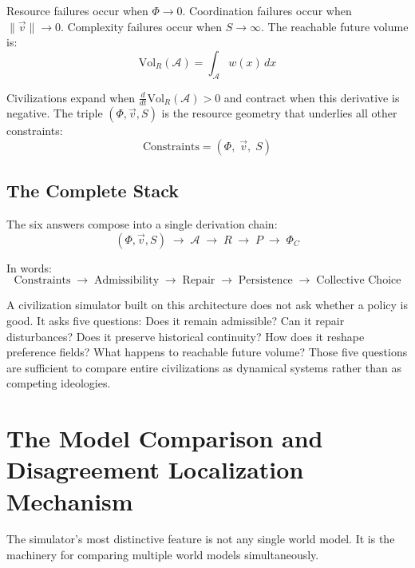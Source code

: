 \documentclass[12pt]{article}
\begin{document}
Resource failures occur when $\Phi \to 0$. Coordination failures occur when $\|\vec{v}\| \to 0$. Complexity failures occur when $S \to \infty$. The reachable future volume is:
\begin{equation}
  \mathrm{Vol}_R(\mathcal{A}) = \int_{\mathcal{A}} w(x)\, dx
\end{equation}

Civilizations expand when $\frac{d}{dt}\mathrm{Vol}_R(\mathcal{A}) > 0$ and contract when this derivative is negative. The triple $(\Phi, \vec{v}, S)$ is the resource geometry that underlies all other constraints:
\begin{equation}
  \boxed{\text{Constraints} = (\Phi,\; \vec{v},\; S)}
\end{equation}

\subsection{The Complete Stack}

The six answers compose into a single derivation chain:
\begin{equation}
  (\Phi, \vec{v}, S)
  \;\longrightarrow\;
  \mathcal{A}
  \;\longrightarrow\;
  R
  \;\longrightarrow\;
  P
  \;\longrightarrow\;
  \Phi_C
\end{equation}

In words:
\begin{equation}
  \boxed{
    \text{Constraints}
    \;\to\;
    \text{Admissibility}
    \;\to\;
    \text{Repair}
    \;\to\;
    \text{Persistence}
    \;\to\;
    \text{Collective Choice}
  }
\end{equation}

A civilization simulator built on this architecture does not ask whether a policy is good. It asks five questions: Does it remain admissible? Can it repair disturbances? Does it preserve historical continuity? How does it reshape preference fields? What happens to reachable future volume? Those five questions are sufficient to compare entire civilizations as dynamical systems rather than as competing ideologies.

\section{The Model Comparison and Disagreement Localization Mechanism}

The simulator's most distinctive feature is not any single world model. It is the machinery for comparing multiple world models simultaneously.
\end{document}
